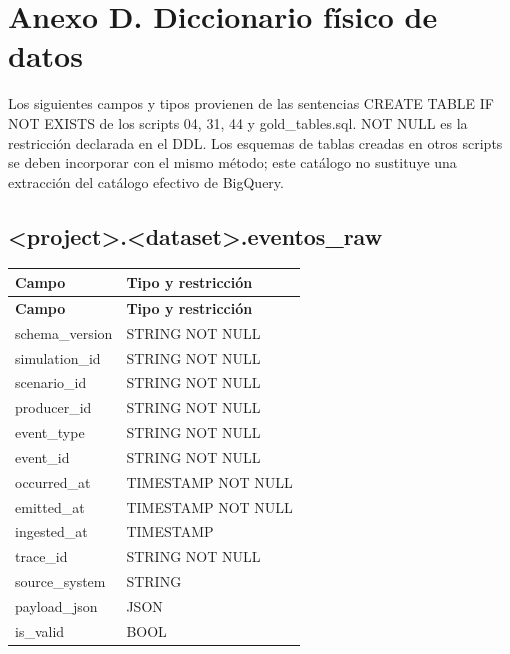 \documentclass[11pt]{article}
\begin{document}
\clearpage
\section*{Anexo D. Diccionario físico de datos}

Los siguientes campos y tipos provienen de las sentencias CREATE TABLE IF NOT EXISTS de los scripts 04, 31, 44 y gold\_\allowbreak{}tables.sql. NOT NULL es la restricción declarada en el DDL. Los esquemas de tablas creadas en otros scripts se deben incorporar con el mismo método; este catálogo no sustituye una extracción del catálogo efectivo de BigQuery.\par

\subsection{<project>.<dataset>.eventos\_\allowbreak{}raw}

\begingroup\small
\begin{longtable}{@{}>{\raggedright\arraybackslash}p{}>{\raggedright\arraybackslash}p{}@{}}
\toprule
\textbf{Campo} & \textbf{Tipo y restricción} \\
\midrule
\endfirsthead
\toprule
\textbf{Campo} & \textbf{Tipo y restricción} \\
\midrule
\endhead
schema\_\allowbreak{}version & STRING NOT NULL \\
simulation\_\allowbreak{}id & STRING NOT NULL \\
scenario\_\allowbreak{}id & STRING NOT NULL \\
producer\_\allowbreak{}id & STRING NOT NULL \\
event\_\allowbreak{}type & STRING NOT NULL \\
event\_\allowbreak{}id & STRING NOT NULL \\
occurred\_\allowbreak{}at & TIMESTAMP NOT NULL \\
emitted\_\allowbreak{}at & TIMESTAMP NOT NULL \\
ingested\_\allowbreak{}at & TIMESTAMP \\
trace\_\allowbreak{}id & STRING NOT NULL \\
source\_\allowbreak{}system & STRING \\
payload\_\allowbreak{}json & JSON \\
is\_\allowbreak{}valid & BOOL \\
\bottomrule
\end{longtable}
\endgroup
\end{document}
